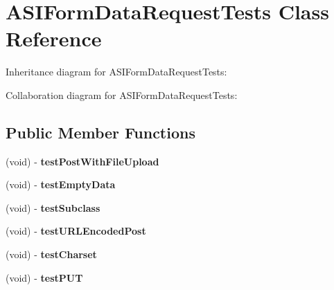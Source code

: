 \hypertarget{interface_a_s_i_form_data_request_tests}{
\section{\-A\-S\-I\-Form\-Data\-Request\-Tests \-Class \-Reference}
\label{interface_a_s_i_form_data_request_tests}
}


\-Inheritance diagram for \-A\-S\-I\-Form\-Data\-Request\-Tests\-:


\-Collaboration diagram for \-A\-S\-I\-Form\-Data\-Request\-Tests\-:
\subsection*{\-Public \-Member \-Functions}
\begin{DoxyCompactItemize}
\item 
\hypertarget{interface_a_s_i_form_data_request_tests_a97e6836c2218303872b7e8ec988e05e8}{
(void) -\/ {\bfseries test\-Post\-With\-File\-Upload}}
\label{interface_a_s_i_form_data_request_tests_a97e6836c2218303872b7e8ec988e05e8}

\item 
\hypertarget{interface_a_s_i_form_data_request_tests_ad7698e89cbbd7117bad367b16e36f9c3}{
(void) -\/ {\bfseries test\-Empty\-Data}}
\label{interface_a_s_i_form_data_request_tests_ad7698e89cbbd7117bad367b16e36f9c3}

\item 
\hypertarget{interface_a_s_i_form_data_request_tests_acab27c6d3e035ec4636aecbecd05b9bc}{
(void) -\/ {\bfseries test\-Subclass}}
\label{interface_a_s_i_form_data_request_tests_acab27c6d3e035ec4636aecbecd05b9bc}

\item 
\hypertarget{interface_a_s_i_form_data_request_tests_abda6e78b5495e780e2e23c709c3f90c7}{
(void) -\/ {\bfseries test\-U\-R\-L\-Encoded\-Post}}
\label{interface_a_s_i_form_data_request_tests_abda6e78b5495e780e2e23c709c3f90c7}

\item 
\hypertarget{interface_a_s_i_form_data_request_tests_a6672bb9cada543b87c09af5835d7c758}{
(void) -\/ {\bfseries test\-Charset}}
\label{interface_a_s_i_form_data_request_tests_a6672bb9cada543b87c09af5835d7c758}

\item 
\hypertarget{interface_a_s_i_form_data_request_tests_ae036727c9ac44195ed7371d3fce1d807}{
(void) -\/ {\bfseries test\-P\-U\-T}}
\label{interface_a_s_i_form_data_request_tests_ae036727c9ac44195ed7371d3fce1d807}


\end{DoxyCompactItemize}
